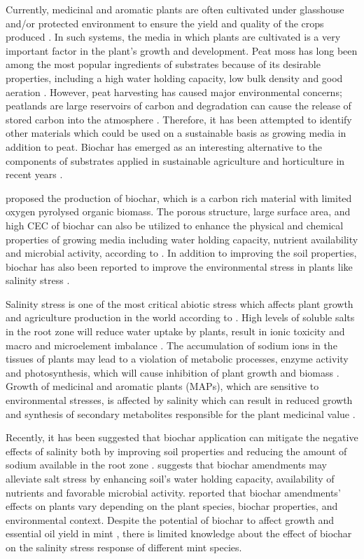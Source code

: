 Currently, medicinal and aromatic plants are often cultivated under glasshouse and/or protected environment to ensure the yield and quality of the crops produced \parencite{Zheljazkov2020}. In such systems, the media in which plants are cultivated is a very important factor in the plant's growth and development. Peat moss has long been among the most popular ingredients of substrates because of its desirable properties, including a high water holding capacity, low bulk density and good aeration \parencite{Dumroese2018}. However, peat harvesting has caused major environmental concerns; peatlands are large reservoirs of carbon and degradation can cause the release of stored carbon into the atmosphere \parencite{Cleary2021}. Therefore, it has been attempted to identify other materials which could be used on a sustainable basis as growing media in addition to peat. Biochar has emerged as an interesting alternative to the components of substrates applied in sustainable agriculture and horticulture in recent years \parencite{Dumroese2018}.

\textcite{Joseph2021} proposed the production of biochar, which is a carbon rich material with limited oxygen pyrolysed organic biomass. The porous structure, large surface area, and high CEC of biochar can also be utilized to enhance the physical and chemical properties of growing media including water holding capacity, nutrient availability and microbial activity, according to \textcite{Joseph2021}. In addition to improving the soil properties, biochar has also been reported to improve the environmental stress in plants like salinity stress \textcite{Farhangi2017}.

Salinity stress is one of the most critical abiotic stress which affects plant growth and agriculture production in the world according to \textcite{Volkov2014}. High levels of soluble salts in the root zone will reduce water uptake by plants, result in ionic toxicity and macro and microelement imbalance \textcite{Volkov2014}. The accumulation of sodium ions in the tissues of plants may lead to a violation of metabolic processes, enzyme activity and photosynthesis, which will cause inhibition of plant growth and biomass \parencite{Volkov2014}. Growth of medicinal and aromatic plants (MAPs), which are sensitive to environmental stresses, is affected by salinity which can result in reduced growth and synthesis of secondary metabolites responsible for the plant medicinal value \textcite{Kalemba2019}.

Recently, it has been suggested that biochar application can mitigate the negative effects of salinity both by improving soil properties and reducing the amount of sodium available in the root zone \textcite{Farhangi2017}. \textcite{Akhtar2021} suggests that biochar amendments may alleviate salt stress by enhancing soil's water holding capacity, availability of nutrients and favorable microbial activity. \textcite{Joseph2021} reported that biochar amendments' effects on plants vary depending on the plant species, biochar properties, and environmental context. Despite the potential of biochar to affect growth and essential oil yield in mint \parencite{Zheljazkov2019}, there is limited knowledge about the effect of biochar on the salinity stress response of different mint species.

